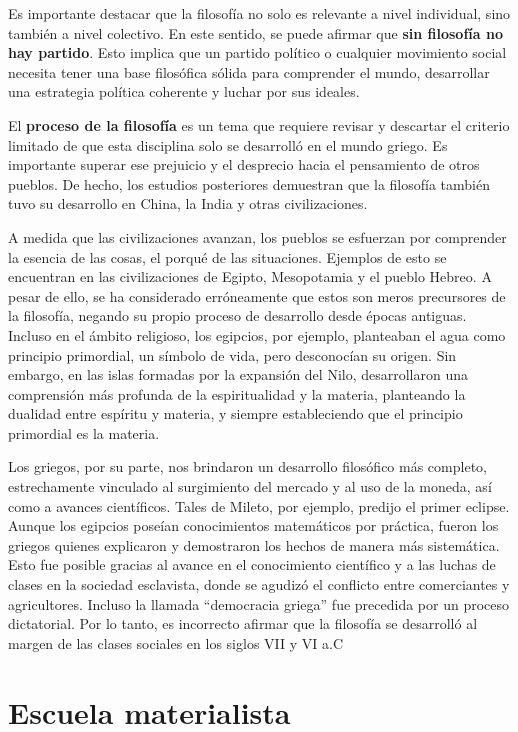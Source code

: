 \documentclass[
  a4paper,
]{article}
\begin{document}
Es importante destacar que la filosofía no solo es relevante a nivel
individual, sino también a nivel colectivo. En este sentido, se puede
afirmar que \textbf{sin filosofía no hay partido}. Esto implica que un
partido político o cualquier movimiento social necesita tener una base
filosófica sólida para comprender el mundo, desarrollar una estrategia
política coherente y luchar por sus ideales.

El \textbf{proceso de la filosofía} es un tema que requiere revisar y
descartar el criterio limitado de que esta disciplina solo se desarrolló
en el mundo griego. Es importante superar ese prejuicio y el desprecio
hacia el pensamiento de otros pueblos. De hecho, los estudios
posteriores demuestran que la filosofía también tuvo su desarrollo en
China, la India y otras civilizaciones.

A medida que las civilizaciones avanzan, los pueblos se esfuerzan por
comprender la esencia de las cosas, el porqué de las situaciones.
Ejemplos de esto se encuentran en las civilizaciones de Egipto,
Mesopotamia y el pueblo Hebreo. A pesar de ello, se ha considerado
erróneamente que estos son meros precursores de la filosofía, negando su
propio proceso de desarrollo desde épocas antiguas. Incluso en el ámbito
religioso, los egipcios, por ejemplo, planteaban el agua como principio
primordial, un símbolo de vida, pero desconocían su origen. Sin embargo,
en las islas formadas por la expansión del Nilo, desarrollaron una
comprensión más profunda de la espiritualidad y la materia, planteando
la dualidad entre espíritu y materia, y siempre estableciendo que el
principio primordial es la materia.

Los griegos, por su parte, nos brindaron un desarrollo filosófico más
completo, estrechamente vinculado al surgimiento del mercado y al uso de
la moneda, así como a avances científicos. Tales de Mileto, por ejemplo,
predijo el primer eclipse. Aunque los egipcios poseían conocimientos
matemáticos por práctica, fueron los griegos quienes explicaron y
demostraron los hechos de manera más sistemática. Esto fue posible
gracias al avance en el conocimiento científico y a las luchas de clases
en la sociedad esclavista, donde se agudizó el conflicto entre
comerciantes y agricultores. Incluso la llamada ``democracia griega''
fue precedida por un proceso dictatorial. Por lo tanto, es incorrecto
afirmar que la filosofía se desarrolló al margen de las clases sociales
en los siglos VII y VI a.C

\hypertarget{escuela-materialista}{%
\section{Escuela materialista}\label{escuela-materialista}}
\end{document}
